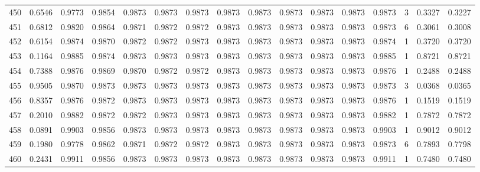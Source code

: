 \begin{tabular}{lrrrrrrrrrrrrrrr}
450 &      0.6546 &  0.9773 &  0.9854 &  0.9873 &  0.9873 &  0.9873 &  0.9873 &  0.9873 &  0.9873 &  0.9873 &   0.9873 &     0.9873 &      3 &                    0.3327 &                     0.3227 \\
451 &      0.6812 &  0.9820 &  0.9864 &  0.9871 &  0.9872 &  0.9872 &  0.9873 &  0.9873 &  0.9873 &  0.9873 &   0.9873 &     0.9873 &      6 &                    0.3061 &                     0.3008 \\
452 &      0.6154 &  0.9874 &  0.9870 &  0.9872 &  0.9872 &  0.9873 &  0.9873 &  0.9873 &  0.9873 &  0.9873 &   0.9873 &     0.9874 &      1 &                    0.3720 &                     0.3720 \\
453 &      0.1164 &  0.9885 &  0.9874 &  0.9873 &  0.9873 &  0.9873 &  0.9873 &  0.9873 &  0.9873 &  0.9873 &   0.9873 &     0.9885 &      1 &                    0.8721 &                     0.8721 \\
454 &      0.7388 &  0.9876 &  0.9869 &  0.9870 &  0.9872 &  0.9872 &  0.9873 &  0.9873 &  0.9873 &  0.9873 &   0.9873 &     0.9876 &      1 &                    0.2488 &                     0.2488 \\
455 &      0.9505 &  0.9870 &  0.9873 &  0.9873 &  0.9873 &  0.9873 &  0.9873 &  0.9873 &  0.9873 &  0.9873 &   0.9873 &     0.9873 &      3 &                    0.0368 &                     0.0365 \\
456 &      0.8357 &  0.9876 &  0.9872 &  0.9873 &  0.9873 &  0.9873 &  0.9873 &  0.9873 &  0.9873 &  0.9873 &   0.9873 &     0.9876 &      1 &                    0.1519 &                     0.1519 \\
457 &      0.2010 &  0.9882 &  0.9872 &  0.9872 &  0.9873 &  0.9873 &  0.9873 &  0.9873 &  0.9873 &  0.9873 &   0.9873 &     0.9882 &      1 &                    0.7872 &                     0.7872 \\
458 &      0.0891 &  0.9903 &  0.9856 &  0.9873 &  0.9873 &  0.9873 &  0.9873 &  0.9873 &  0.9873 &  0.9873 &   0.9873 &     0.9903 &      1 &                    0.9012 &                     0.9012 \\
459 &      0.1980 &  0.9778 &  0.9862 &  0.9871 &  0.9872 &  0.9872 &  0.9873 &  0.9873 &  0.9873 &  0.9873 &   0.9873 &     0.9873 &      6 &                    0.7893 &                     0.7798 \\
460 &      0.2431 &  0.9911 &  0.9856 &  0.9873 &  0.9873 &  0.9873 &  0.9873 &  0.9873 &  0.9873 &  0.9873 &   0.9873 &     0.9911 &      1 &                    0.7480 &                     0.7480 \\

\end{tabular}
